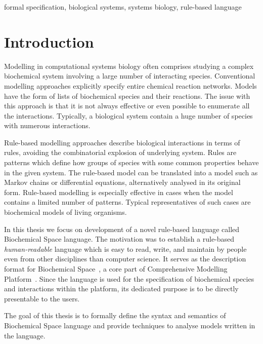 \documentclass[12pt, twoside]{fithesis2} %
\begin{document}
\begin{ThesisKeyWords}
formal specification, biological systems, systems biology, rule-based language
\end{ThesisKeyWords}

\MainMatter
\tableofcontents

\chapter{Introduction}

Modelling in computational systems biology often comprises studying a complex biochemical system involving a large number of interacting species. Conventional modelling approaches explicitly specify entire chemical reaction networks. Models have the form of lists of biochemical species and their reactions. The issue with this approach is that it is not always effective or even possible to enumerate all the interactions. Typically, a biological system contain a huge number of species with numerous interactions.

Rule-based modelling approaches describe biological interactions in terms of rules, avoiding the combinatorial explosion of underlying system. Rules are patterns which define how groups of species with some common properties behave in the given system. The rule-based model can be translated into a model such as Markov chains or differential equations, alternatively analysed in its original form. Rule-based modelling is especially effective in cases when the model contains a limited number of patterns. Typical representatives of such cases are biochemical models of living organisms.

In this thesis we focus on development of a novel rule-based language called Biochemical Space language. The motivation was to establish a rule-based \emph{human-readable} language which is easy to read, write, and maintain by people even from other disciplines than computer science. It serves as the description format for Biochemical Space~\cite{BCS}, a core part of Comprehensive Modelling Platform~\cite{cs2bio2013}. Since the language is used for the specification of biochemical species and interactions within the platform, its dedicated purpose is to be directly presentable to the users.

The goal of this thesis is to formally define the syntax and semantics of Biochemical Space language and provide techniques to analyse models written in the language. 
\end{document}
